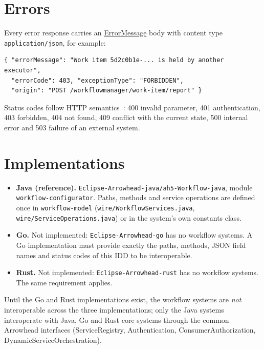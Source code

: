 \documentclass[a4paper]{arrowhead}
\newcommand{\mref}[1]{{\textcolor{ArrowheadPurple}{\hyperref[sec:model:#1]{#1}}}}
\begin{document}
\section{Errors}
\label{sec:errors}
Every error response carries an \mref{ErrorMessage} body with content type \texttt{application/\allowbreak{}json}, for example:
\begin{lstlisting}
{ "errorMessage": "Work item 5d2c0b1e-... is held by another executor",
  "errorCode": 403, "exceptionType": "FORBIDDEN",
  "origin": "POST /workflowmanager/work-item/report" }
\end{lstlisting}
Status codes follow HTTP semantics~\cite{rfc9110}: 400 invalid parameter, 401 authentication, 403 forbidden, 404 not
found, 409 conflict with the current state, 500 internal error and 503 failure of an external system.


\section{Implementations}
\label{sec:implementations}
\begin{itemize}
\item \textbf{Java (reference).} \texttt{Eclipse-\allowbreak{}Arrowhead-\allowbreak{}java/\allowbreak{}ah5-\allowbreak{}Workflow-\allowbreak{}java}, module \texttt{workflow-\allowbreak{}configurator}. Paths, methods and service
operations are defined once in \texttt{workflow-\allowbreak{}model} (\texttt{wire/\allowbreak{}Workflow\allowbreak{}Services.\allowbreak{}java}, \texttt{wire/\allowbreak{}Service\allowbreak{}Operations.\allowbreak{}java}) or in the system's own constants class.
\item \textbf{Go.} Not implemented: \texttt{Eclipse-\allowbreak{}Arrowhead-\allowbreak{}go} has no workflow systems. A Go implementation must
provide exactly the paths, methods, JSON field names and status codes of this IDD to be interoperable.
\item \textbf{Rust.} Not implemented: \texttt{Eclipse-\allowbreak{}Arrowhead-\allowbreak{}rust} has no workflow systems. The same requirement applies.
\end{itemize}
Until the Go and Rust implementations exist, the workflow systems are \emph{not} interoperable across the three
implementations; only the Java systems interoperate with Java, Go and Rust core systems through the common Arrowhead
interfaces (ServiceRegistry, Authentication, ConsumerAuthorization, DynamicServiceOrchestration).


\newpage


\end{document}
